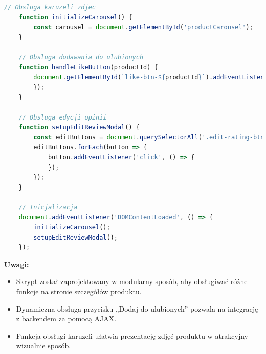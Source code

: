 \documentclass[12pt,a4paper,oneside]{article}
\theoremstyle{definition}
\numberwithin{equation}{section}
\begin{document}
\begin{itemize}
        \begin{lstlisting}[language=JavaScript, caption=Skrypt product\_detail.js]
    // Obsluga karuzeli zdjec
    function initializeCarousel() {
        const carousel = document.getElementById('productCarousel');
    }

    // Obsluga dodawania do ulubionych
    function handleLikeButton(productId) {
        document.getElementById(`like-btn-${productId}`).addEventListener('click', () => {
        });
    }

    // Obsluga edycji opinii
    function setupEditReviewModal() {
        const editButtons = document.querySelectorAll('.edit-rating-btn');
        editButtons.forEach(button => {
            button.addEventListener('click', () => {
            });
        });
    }

    // Inicjalizacja
    document.addEventListener('DOMContentLoaded', () => {
        initializeCarousel();
        setupEditReviewModal();
    });
        \end{lstlisting}

        \textbf{Uwagi:}
            \begin{itemize}
                \item Skrypt został zaprojektowany w modularny sposób, aby obsługiwać różne funkcje na stronie szczegółów produktu.
                \item Dynamiczna obsługa przycisku „Dodaj do ulubionych” pozwala na integrację z backendem za pomocą AJAX.
                \item Funkcja obsługi karuzeli ułatwia prezentację zdjęć produktu w atrakcyjny wizualnie sposób.
            \end{itemize}
\end{itemize}
\end{document}

